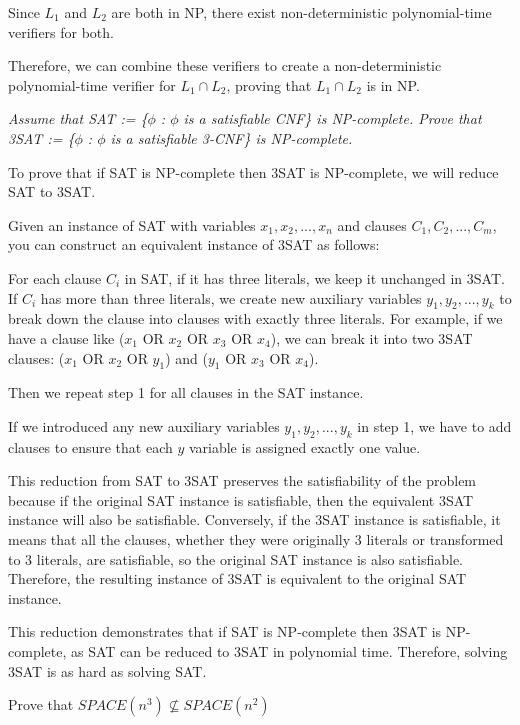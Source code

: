\documentclass{cis320}
\begin{document}
Since \(L_1\) and \(L_2\) are both in NP, there exist non-deterministic polynomial-time verifiers for both. 

Therefore, we can combine these verifiers to create a non-deterministic polynomial-time verifier for \( L_1 \cap L_2\), proving that \( L_1 \cap L_2\) is in NP.
\bigskip




\HWproblem
\textit{Assume that SAT := \{$\phi$  : $\phi$ is a satisfiable CNF\} is NP-complete. Prove that 3SAT := \{$\phi$ : $\phi$  is a satisfiable 3-CNF\} is NP-complete.}

\:

To prove that if SAT is NP-complete then 3SAT is NP-complete, we will reduce SAT to 3SAT.

Given an instance of SAT with variables $x_1, x_2, ..., x_n$ and clauses $C_1, C_2, ..., C_m$, you can construct an equivalent instance of 3SAT as follows:

For each clause $C_i$ in SAT, if it has three literals, we keep it unchanged in 3SAT. If $C_i$ has more than three literals, we create new auxiliary variables $y_1, y_2, ..., y_k$ to break down the clause into clauses with exactly three literals. For example, if we have a clause like ($x_1$ OR $x_2$ OR $x_3$ OR $x_4$), we can break it into two 3SAT clauses: ($x_1$ OR $x_2$ OR $y_1$) and ($y_1$ OR $x_3$ OR $x_4$).

Then we repeat step 1 for all clauses in the SAT instance.

If we introduced any new auxiliary variables $y_1, y_2, ..., y_k$ in step 1, we have to add clauses to ensure that each $y$ variable is assigned exactly one value.

This reduction from SAT to 3SAT preserves the satisfiability of the problem because if the original SAT instance is satisfiable, then the equivalent 3SAT instance will also be satisfiable. Conversely, if the 3SAT instance is satisfiable, it means that all the clauses, whether they were originally 3 literals or transformed to 3 literals, are satisfiable, so the original SAT instance is also satisfiable. Therefore, the resulting instance of 3SAT is equivalent to the original SAT instance. 

This reduction demonstrates that if SAT is NP-complete then 3SAT is NP-complete, as SAT can be reduced to 3SAT in polynomial time. Therefore, solving 3SAT is as hard as solving SAT.
\bigskip




\HWproblem
Prove that \( SPACE(n^3) \not\subseteq SPACE(n^2) \)
\end{document}
